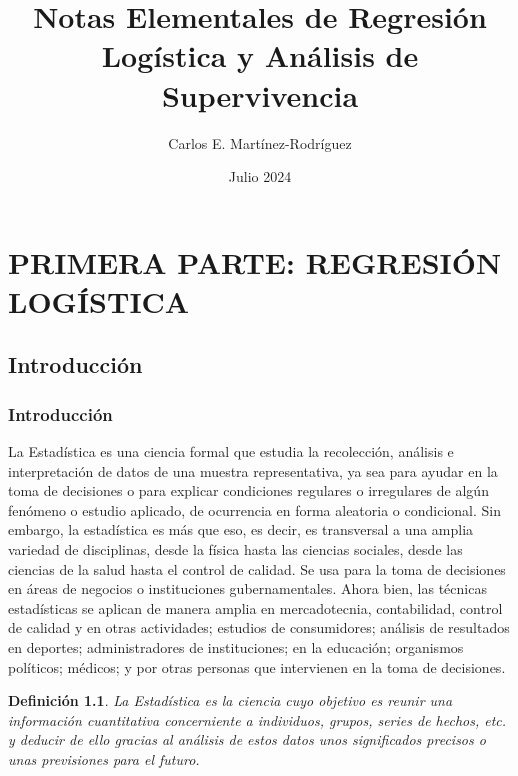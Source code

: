 \documentclass[a4paper]{report} %
\title{Notas Elementales de Regresi\'on Log\'istica y An\'alisis de Supervivencia}
\author{Carlos E. Mart\'inez-Rodr\'iguez}
\date{Julio 2024}
\newtheorem{Def}{Definici\'on}[chapter]
\begin{document}
\maketitle

\tableofcontents

\part{PRIMERA PARTE: REGRESI\'ON LOG\'ISTICA}


\chapter{Introducci\'on}

\section{Introducci\'on}

La Estad\'istica es una ciencia formal que estudia la recolecci\'on, an\'alisis e interpretaci\'on de datos de una muestra representativa, ya sea para ayudar en la toma de decisiones o para explicar condiciones regulares o irregulares de alg\'un fen\'omeno o estudio aplicado, de ocurrencia en forma aleatoria o condicional. Sin embargo, la estad\'istica es m\'as que eso, es decir, es transversal a una amplia variedad de disciplinas, desde la f\'isica hasta las ciencias sociales, desde las ciencias de la salud hasta el control de calidad. Se usa para la toma de decisiones en \'areas de negocios o instituciones gubernamentales. Ahora bien, las t\'ecnicas estad\'isticas se aplican de manera amplia en mercadotecnia, contabilidad, control de calidad y en otras actividades; estudios de consumidores; an\'alisis de resultados en deportes; administradores de instituciones; en la educaci\'on; organismos pol\'iticos; m\'edicos; y por otras personas que intervienen en la toma de decisiones.

\begin{Def}
    La Estad\'istica es la ciencia cuyo objetivo es reunir una informaci\'on cuantitativa concerniente a individuos, grupos, series de hechos, etc. y deducir de ello gracias al an\'alisis de estos datos unos significados precisos o unas previsiones para el futuro.
\end{Def}
\end{document}
